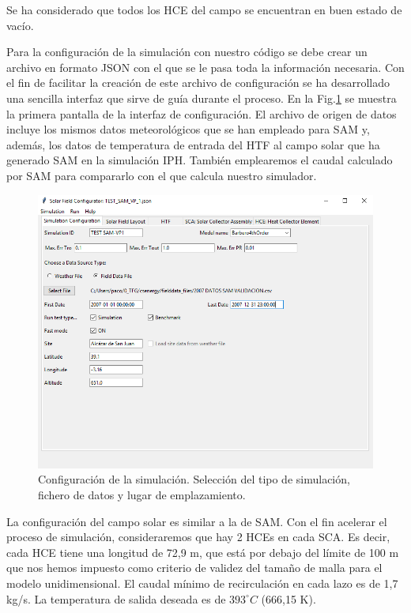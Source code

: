 Se ha considerado que todos los HCE  del campo se encuentran en buen estado de vacío.

Para la configuración de la simulación con nuestro código se debe crear un archivo en formato JSON con el que se le pasa toda la información necesaria. Con el fin de facilitar la creación de este archivo de configuración se ha desarrollado una sencilla interfaz que sirve de guía durante el proceso. En la Fig.\ref{fig:interface01} se muestra la primera pantalla de la interfaz de configuración. El archivo de origen de datos incluye los mismos datos meteorológicos que se han empleado para SAM y, además, los datos de temperatura de entrada del HTF al campo solar que ha generado SAM en la simulación IPH. También emplearemos el caudal calculado por SAM para compararlo con el que calcula nuestro simulador.

\begin{figure}[H]
\includegraphics[width=0.9\linewidth]{images/interface01.png}
\caption[Configuración del tipo de simulación]{Configuración de la simulación. Selección del tipo de simulación, fichero de datos y lugar de emplazamiento.} 
\label{fig:interface01}
\end{figure}

La configuración del campo solar es similar a la de SAM. Con el fin acelerar el proceso de simulación, consideraremos que hay 2 HCEs en cada SCA. Es decir, cada HCE tiene una longitud de 72,9 m, que está por debajo del límite de 100 m que nos hemos impuesto como criterio de validez del tamaño de malla para el modelo unidimensional.  El caudal mínimo de recirculación en cada lazo es de 1,7 kg/s. La temperatura de salida deseada es de $393 ^\circ C$ (666,15 K).

